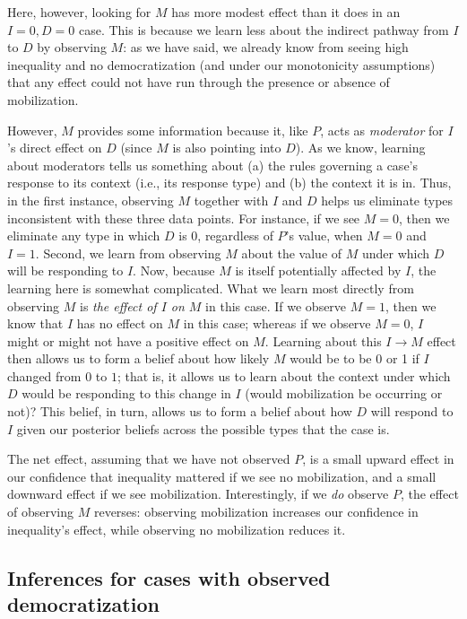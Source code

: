 \documentclass[
  12pt,
]{book}
\begin{document}
Here, however, looking for \(M\) has more modest effect than it does in an \(I=0, D=0\) case. This is because we learn less about the indirect pathway from \(I\) to \(D\) by observing \(M\): as we have said, we already know from seeing high inequality and no democratization (and under our monotonicity assumptions) that any effect could not have run through the presence or absence of mobilization.

However, \(M\) provides some information because it, like \(P\), acts as \emph{moderator} for \(I\)'s direct effect on \(D\) (since \(M\) is also pointing into \(D\)). As we know, learning about moderators tells us something about (a) the rules governing a case's response to its context (i.e., its response type) and (b) the context it is in. Thus, in the first instance, observing \(M\) together with \(I\) and \(D\) helps us eliminate types inconsistent with these three data points. For instance, if we see \(M=0\), then we eliminate any type in which \(D\) is 0, regardless of \(P\)'s value, when \(M=0\) and \(I=1\). Second, we learn from observing \(M\) about the value of \(M\) under which \(D\) will be responding to \(I\). Now, because \(M\) is itself potentially affected by \(I\), the learning here is somewhat complicated. What we learn most directly from observing \(M\) is \emph{the effect of \(I\) on \(M\)} in this case. If we observe \(M=1\), then we know that \(I\) has no effect on \(M\) in this case; whereas if we observe \(M=0\), \(I\) might or might not have a positive effect on \(M\). Learning about this \(I \rightarrow M\) effect then allows us to form a belief about how likely \(M\) would be to be 0 or 1 if \(I\) changed from \(0\) to \(1\); that is, it allows us to learn about the context under which \(D\) would be responding to this change in \(I\) (would mobilization be occurring or not)? This belief, in turn, allows us to form a belief about how \(D\) will respond to \(I\) given our posterior beliefs across the possible types that the case is.

The net effect, assuming that we have not observed \(P\), is a small upward effect in our confidence that inequality mattered if we see no mobilization, and a small downward effect if we see mobilization. Interestingly, if we \emph{do} observe \(P\), the effect of observing \(M\) reverses: observing mobilization increases our confidence in inequality's effect, while observing no mobilization reduces it.

\hypertarget{inferences-for-cases-with-observed-democratization}{%
\subsection{Inferences for cases with observed democratization}\label{inferences-for-cases-with-observed-democratization}}
\end{document}

